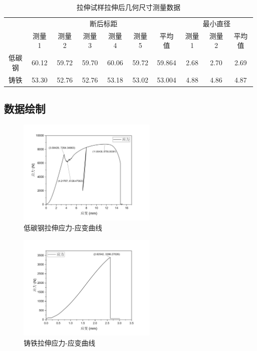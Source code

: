 \begin{table}[!ht]
    \caption{拉伸试样拉伸后几何尺寸测量数据}
    \begin{tabular}{*{10}{c}}\toprule
        & \multicolumn{6}{c}{断后标距} & \multicolumn{3}{c}{最小直径} \\
        & 测量 1 & 测量 2 & 测量 3 & 测量 4 & 测量 5 & 平均值 & 测量 1 & 测量 2 & 平均值 \\ \midrule
        低碳钢 & 60.12 & 59.72 & 59.70 & 60.06 & 59.72 & 59.864 & 2.68 & 2.70 & 2.69  \\ 
        铸铁 & 53.30 & 52.76 & 52.76 & 53.18 & 53.02 & 53.004 & 4.88 & 4.86 & 4.87  \\ \bottomrule
    \end{tabular}
\end{table}
\subsection{数据绘制}
\begin{figure}[!ht]
    \caption{低碳钢拉伸应力-应变曲线}
    \includegraphics[width=0.6\textwidth]{img/A6/steelPull.pdf}
\end{figure}\newpage
\begin{figure}[!ht]
    \caption{铸铁拉伸应力-应变曲线}
    \includegraphics[width=0.6\textwidth]{img/A6/ironPull.pdf}
\end{figure}
